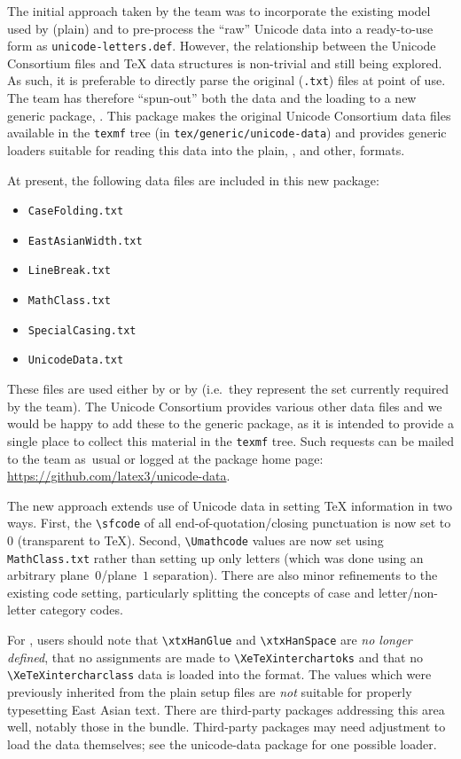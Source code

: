 \documentclass{ltnews}
\begin{document}
The initial approach taken by the team was to incorporate the existing model
used by (plain)  and to pre-process the ``raw'' Unicode data into
a ready-to-use form as \verb|unicode-letters.def|. However, the relationship
between the Unicode Consortium files and \TeX{} data structures is non-trivial and still
being explored. As such, it is preferable to directly parse the original
(\verb|.txt|) files at point of use. The team has therefore ``spun-out'' both
the data and the loading to a new generic package, . This
package makes the original Unicode Consortium data files available in the
\verb|texmf| tree (in \verb|tex/generic/unicode-data|) and provides generic
loaders suitable for reading this data into the plain, \LaTeXe{}, and other,
formats.

At present, the following data files are included in this new package:
\begin{itemize}\parskip=0pt
  \item \verb|CaseFolding.txt|
  \item \verb|EastAsianWidth.txt|
  \item \verb|LineBreak.txt|
  \item \verb|MathClass.txt|
  \item \verb|SpecialCasing.txt|
  \item \verb|UnicodeData.txt|
\end{itemize}
These files are used either by \LaTeXe{} or by 
(i.e.~they represent the set currently required by the team). The
Unicode Consortium provides various other data files and we would be happy to add
these to the generic package, as it is intended to provide a single place
to collect this material in the \verb|texmf| tree. Such requests can be
mailed to the team as~usual or logged at the package home page:
\url{https://github.com/latex3/unicode-data}.

The new approach extends use of Unicode data in setting \TeX{} information in
two ways. First, the \verb|\sfcode| of all end-of-quotation/closing punctuation
is now set to $0$ (transparent to \TeX{}). Second, \verb|\Umathcode| values are
now set using \verb|MathClass.txt| rather than setting up only letters (which
was done using an arbitrary plane~$0$/plane~$1$ separation). There are also
minor refinements to the existing code setting, particularly splitting the
concepts of case and letter/non-letter category codes.

For , users should note that \verb|\xtxHanGlue| and
\verb|\xtxHanSpace| are \emph{no longer defined}, that no assignments are made
to \verb|\XeTeXinterchartoks| and that no \verb|\XeTeXintercharclass| data is
loaded into the format. The values which were previously inherited from
the plain  setup files are \emph{not} suitable for properly
typesetting East Asian text. There are third-party packages addressing this
area well, notably those in the  bundle. Third-party packages
may need adjustment to load the data themselves; see the \textsf{unicode-data}
package for one possible loader.
\end{document}
